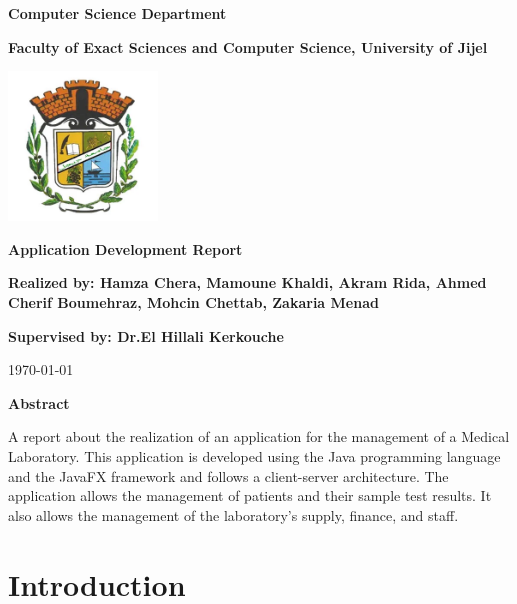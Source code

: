 \documentclass{article}
\begin{document}
\begin{titlepage}
    \centering
    \vspace{1cm}
    \Large\textbf{Computer Science Department}

    \Large\textbf{
    Faculty of Exact Sciences and Computer Science, University of Jijel}

    \vspace{1.5cm}

    \includegraphics[width=150px]{media/univlogo.png}
    \vspace*{1cm}
    
    \Huge\textbf{Application Development Report}
    
    \vspace{1.5cm}
    \Large\textbf{Realized by:
    Hamza Chera, Mamoune Khaldi, Akram Rida, Ahmed Cherif Boumehraz, Mohcin Chettab, Zakaria Menad}

    \vspace{0.5cm}
    \Large\textbf{Supervised by: Dr.El Hillali Kerkouche}

    \vspace{1cm}
    \today
    
    \vspace{1.5cm}
    
    \normalsize
    \textbf{Abstract}
    
    A report about the realization of an application for the management of a Medical Laboratory. This application is developed using the Java programming language and the JavaFX framework and follows a client-server architecture. The application allows the management of patients and their sample test results. It also allows the management of the laboratory's supply, finance, and staff.
    
    
\end{titlepage}

\tableofcontents

\newpage

\section{Introduction}
\end{document}
